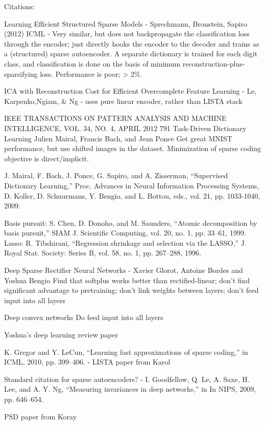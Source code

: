 Citations:

Learning Efficient Structured Sparse Models - Sprechmann, Bronstein, Sapiro (2012) ICML - Very similar, but does not backpropagate the classification loss through the encoder; just directly hooks the encoder to the decoder and trains as a (structured) sparse autoencoder.  A separate dictionary is trained for each digit class, and classification is done on the basis of minimum reconstruction-plus-sparsifying loss.  Performance is poor; > 2\%.  

ICA with Reconstruction Cost for Efficient Overcomplete Feature Learning - Le, Karpenko,Ngiam, \& Ng - uses pure linear encoder, rather than LISTA stack

IEEE TRANSACTIONS ON PATTERN ANALYSIS AND MACHINE INTELLIGENCE, VOL. 34, NO. 4, APRIL 2012 791
Task-Driven Dictionary Learning Julien Mairal, Francis Bach, and Jean Ponce
Get great MNIST performance, but use shifted images in the dataset.  Minimization of sparse coding objective is direct/implicit.

J. Mairal, F. Bach, J. Ponce, G. Sapiro, and A. Zisserman, “Supervised Dictionary Learning,” Proc. Advances in Neural Information Processing Systems, D. Koller, D. Schuurmans, Y. Bengio, and L. Bottou, eds., vol. 21, pp. 1033-1040, 2009.

Basis pursuit: S. Chen, D. Donoho, and M. Saunders, “Atomic decomposition by basis pursuit,” SIAM J. Scientific Computing, vol. 20, no. 1, pp. 33–61, 1999.
Lasso: R. Tibshirani, “Regression shrinkage and selection via the LASSO,” J. Royal Stat. Society: Series B, vol. 58, no. 1, pp. 267–288, 1996.



Deep Sparse Rectifier Neural Networks - Xavier Glorot, Antoine Bordes and Yoshua Bengio
Find that softplus works better than rectified-linear; don't find significant advantage to pretraining; don't link weights between layers; don't feed input into all layers

Deep convex networks
Do feed input into all layers

Yoshua's deep learning review paper

K. Gregor and Y. LeCun, “Learning fast approximations of sparse coding,” in ICML, 2010, pp. 399–406. - LISTA paper from Karol

Standard citation for sparse autoencoders? - I. Goodfellow, Q. Le, A. Saxe, H. Lee, and A. Y. Ng, “Measuring invariances in deep networks,” in In NIPS, 2009, pp. 646–654.

PSD paper from Koray

